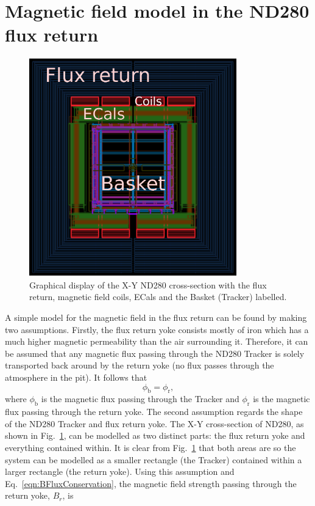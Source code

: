 \section{Magnetic field model in the ND280 flux return}
\label{sec:MagneticFieldModel}
\begin{figure}
  \centering
  \includegraphics[width=9cm]{images/magnetic_field/ND280FluxReturn}
  \caption{Graphical display of the X-Y ND280 cross-section with the flux return, magnetic field coils, ECals and the Basket (Tracker) labelled.}
  \label{fig:ND280FluxReturn}
\end{figure}
A simple model for the magnetic field in the flux return can be found by making two assumptions.  Firstly, the flux return yoke consists mostly of iron which has a much higher magnetic permeability than the air surrounding it.  Therefore, it can be assumed that any magnetic flux passing through the ND280 Tracker is solely transported back around by the return yoke (no flux passes through the atmosphere in the pit).  It follows that
\begin{equation}
  \phi_{\textrm{b}} = \phi_{\textrm{r}},
  \label{eqn:BFluxConservation}
\end{equation}
where $\phi_{\textrm{b}}$ is the magnetic flux passing through the Tracker and $\phi_{\textrm{r}}$ is the magnetic flux passing through the return yoke.  The second assumption regards the shape of the ND280 Tracker and flux return yoke.  The X-Y cross-section of ND280, as shown in Fig.~\ref{fig:ND280FluxReturn}, can be modelled as two distinct parts: the flux return yoke and everything contained within.  It is clear from Fig.~\ref{fig:ND280FluxReturn} that both areas are  so the system can be modelled as a smaller rectangle (the Tracker) contained within a larger rectangle (the return yoke).  Using this assumption and Eq.~\ref{eqn:BFluxConservation}, the magnetic field strength passing through the return yoke, $B_{r}$, is
